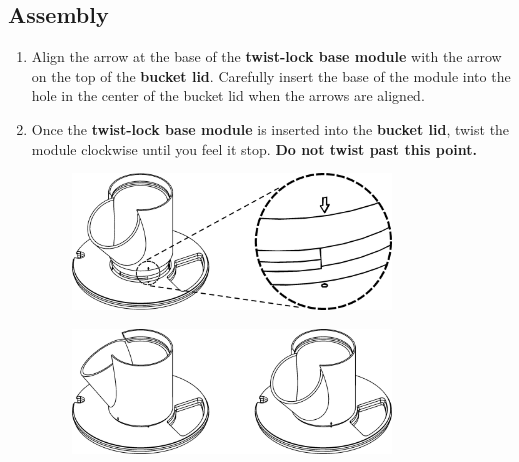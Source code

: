 \clearpage

\setlength{\intextsep}{15.0pt plus 0.0pt minus 0.0pt}
\setlength{\floatsep}{0.0pt plus 0.0pt minus 0.0pt}
\setlength{\textfloatsep}{15.0pt plus 0.0pt minus 0.0pt}
\setlength{\belowcaptionskip}{-20.0pt}

\subsection{Assembly}

\begin{enumerate}

\item Align the arrow at the base of the \textbf{twist-lock base module} with the arrow on the top of the \textbf{bucket lid}. Carefully insert the base of the module into the hole in the center of the bucket lid when the arrows are aligned.

\item Once the \textbf{twist-lock base module} is inserted into the \textbf{bucket lid}, twist the module clockwise until you feel it stop. \textbf{Do not twist past this point.}

\begin{figure}[h]
    \centering
    \includegraphics[width=0.8\textwidth]{images/80mm/80mm_assembly_1.png}
    \caption*{}
    \label{fig:80mm-one}
\end{figure}
\begin{figure}[h!]
    \centering
    \includegraphics[width=0.8\textwidth]{images/80mm/80mm_assembly_2.png}
    \caption*{}
    \label{fig:80mm-two}
\end{figure}


\end{enumerate}
